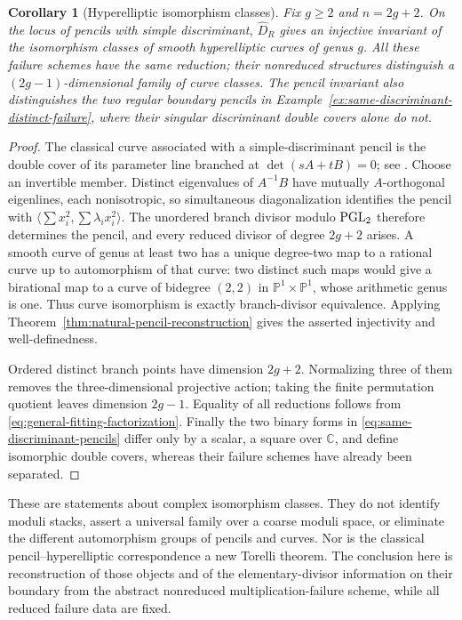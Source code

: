 \documentclass[11pt,reqno]{amsart}
\numberwithin{equation}{section}
\newtheorem{corollary}[theorem]{Corollary}
\theoremstyle{definition}\newtheorem{definition}[theorem]{Definition}
\theoremstyle{remark}\newtheorem{remark}[theorem]{Remark}
\newcommand{\C}{\mathbb C}\newcommand{\Q}{\mathbb Q}
\newcommand{\Pj}{\mathbb P}\newcommand{\A}{\mathbb A}
\begin{document}
\begin{corollary}[Hyperelliptic isomorphism classes]
\label{cor:hyperelliptic-failure-invariant}
Fix \(g\ge2\) and \(n=2g+2\).  On the locus of pencils with
simple discriminant, \(\widehat D_R\) gives an injective invariant
of the isomorphism classes of smooth hyperelliptic curves of genus
\(g\).  All these failure schemes have the same reduction; their
nonreduced structures distinguish a \((2g-1)\)-dimensional family
of curve classes.  The pencil invariant also distinguishes the two
regular boundary pencils in
Example~\ref{ex:same-discriminant-distinct-failure}, where their
singular discriminant double covers alone do not.
\end{corollary}
\begin{proof}
The classical curve associated with a simple-discriminant pencil is
the double cover of its parameter line branched at
\(\det(sA+tB)=0\); see \cite[\S4.2, equation (4.3)]{SmithQuadrics}.
Choose an invertible member.  Distinct eigenvalues of \(A^{-1}B\)
have mutually \(A\)-orthogonal eigenlines, each nonisotropic, so
simultaneous diagonalization identifies the pencil with
\(\langle\sum x_i^2,\sum\lambda_i x_i^2\rangle\).
The unordered branch divisor modulo \(\operatorname{PGL}_2\) therefore
determines the pencil, and every reduced divisor of degree \(2g+2\)
arises.  A smooth curve of genus at least two has a unique degree-two
map to a rational curve up to automorphism of that curve: two distinct
such maps would give a birational map to a curve of bidegree \((2,2)\)
in \(\Pj^1\times\Pj^1\), whose arithmetic genus is one.
Thus curve isomorphism is exactly branch-divisor equivalence.
Applying Theorem~\ref{thm:natural-pencil-reconstruction} gives the
asserted injectivity and well-definedness.

Ordered distinct branch points have dimension \(2g+2\).
Normalizing three of them removes the three-dimensional projective
action; taking the finite permutation quotient leaves dimension
\(2g-1\).  Equality of all reductions follows from
\eqref{eq:general-fitting-factorization}.  Finally the two binary
forms in \eqref{eq:same-discriminant-pencils} differ only by a
scalar, a square over \(\C\), and define isomorphic double covers,
whereas their failure schemes have already been separated.
\end{proof}

These are statements about complex isomorphism classes.  They do not
identify moduli stacks, assert a universal family over a coarse moduli
space, or eliminate the different automorphism groups of pencils and
curves.  Nor is the classical pencil--hyperelliptic correspondence a
new Torelli theorem.  The conclusion here is reconstruction of those
objects and of the elementary-divisor information on their boundary
from the abstract nonreduced multiplication-failure scheme, while all
reduced failure data are fixed.
\end{document}
